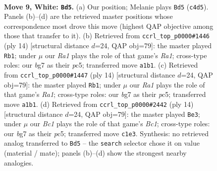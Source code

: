 \documentclass[11pt]{article}
\begin{document}
\clearpage

\begin{figure}[p]\centering
\begin{subfigure}{0.46\textwidth}\centering
\resizebox{\linewidth}{!}{%
\newchessgame
\chessboard[
  setfen={rnbqk2r/ppp1p1b1/6p1/5p1p/2BPP3/2P2N2/P4PPP/R1BQK2R w KQkq - 0 9},
  showmover=false,
  pgfstyle=straightmove, color=movearrow, markmove={c4-d5}
]}
\caption{}
\end{subfigure}\hfill
\begin{subfigure}{0.46\textwidth}\centering
\resizebox{\linewidth}{!}{%
\newchessgame
\chessboard[
  setfen={rnbqk2r/pp2ppbp/6p1/2p5/3PP3/2P2N2/P4PPP/R1BQKB1R w KQkq - 0 8},
  showmover=false,
  pgfstyle=straightmove, color=movearrow, markmove={a1-b1}
]}
\caption{}
\end{subfigure}
\\[4pt]
\begin{subfigure}{0.46\textwidth}\centering
\resizebox{\linewidth}{!}{%
\newchessgame
\chessboard[
  setfen={rnbqk2r/pp2ppbp/6p1/2p5/3PP3/2P2N2/P4PPP/R1BQKB1R w KQkq - 0 8},
  showmover=false,
  pgfstyle=straightmove, color=movearrow, markmove={a1-b1}
]}
\caption{}
\end{subfigure}\hfill
\begin{subfigure}{0.46\textwidth}\centering
\resizebox{\linewidth}{!}{%
\newchessgame
\chessboard[
  setfen={rnbqk2r/pp2ppbp/6p1/2p5/3PP3/2P2N2/P4PPP/R1BQKB1R w KQkq - 0 8},
  showmover=false,
  pgfstyle=straightmove, color=movearrow, markmove={c1-e3}
]}
\caption{}
\end{subfigure}
\caption{\textbf{Move 9, White: \texttt{Bd5}.} (a) Our position; Melanie plays \texttt{Bd5} (\texttt{c4d5}). Panels (b)--(d) are the retrieved master positions whose correspondence most drove this move (highest QAP objective among those that transfer to it). (b) Retrieved from \texttt{ccrl\_top\_p0000\#1446} (ply 14) [structural distance $d$=24, QAP obj=79]: the master played \texttt{Rb1}; under $\mu$ our \emph{Ra1} plays the role of that game's \emph{Ra1}; cross-type roles: our \emph{b}g7 as their \emph{p}c5; transferred move \texttt{a1b1}. (c) Retrieved from \texttt{ccrl\_top\_p0000\#1447} (ply 14) [structural distance $d$=24, QAP obj=79]: the master played \texttt{Rb1}; under $\mu$ our \emph{Ra1} plays the role of that game's \emph{Ra1}; cross-type roles: our \emph{b}g7 as their \emph{p}c5; transferred move \texttt{a1b1}. (d) Retrieved from \texttt{ccrl\_top\_p0000\#2442} (ply 14) [structural distance $d$=24, QAP obj=79]: the master played \texttt{Be3}; under $\mu$ our \emph{Bc1} plays the role of that game's \emph{Bc1}; cross-type roles: our \emph{b}g7 as their \emph{p}c5; transferred move \texttt{c1e3}. Synthesis: no retrieved analog transferred to \texttt{Bd5} -- the \texttt{search} selector chose it on value (material / mate); panels (b)--(d) show the strongest nearby analogies.}
\label{fig:thought-m16}
\end{figure}
\end{document}
